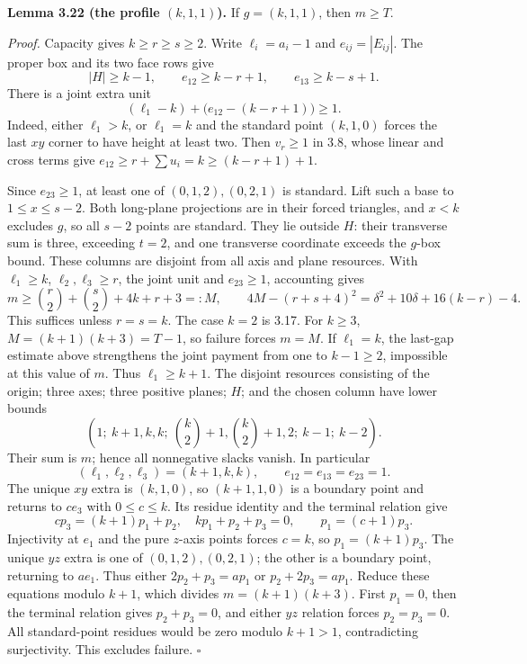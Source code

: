 \documentclass[11pt]{article}
\begin{document}
\label{res:A12.7}
\textbf{Lemma 3.22 (the profile $(k,1,1)$).}
If $g=(k,1,1)$, then $m\ge T$.

\emph{Proof.}
Capacity gives $k\ge r\ge s\ge2$.  Write $\ell_i=a_i-1$ and
$e_{ij}=|E_{ij}|$.  The proper box and its two face rows give
\[
 |H|\ge k-1,\qquad e_{12}\ge k-r+1,\qquad e_{13}\ge k-s+1.
\]
There is a joint extra unit
\[
 (\ell_1-k)+\bigl(e_{12}-(k-r+1)\bigr)\ge1.
\]
Indeed, either $\ell_1>k$, or $\ell_1=k$ and the standard point
$(k,1,0)$ forces the last $xy$ corner to have height at least two.
Then $v_r\ge1$ in 3.8, whose linear and cross terms give
$e_{12}\ge r+\sum u_i=k\ge(k-r+1)+1$.

Since $e_{23}\ge1$, at least one of $(0,1,2),(0,2,1)$ is standard.
Lift such a base to $1\le x\le s-2$.  Both long-plane projections
are in their forced triangles, and $x<k$ excludes $g$, so all $s-2$
points are standard.  They lie outside $H$: their transverse sum is
three, exceeding $t=2$, and one transverse coordinate exceeds the
$g$-box bound.  These columns are disjoint from all axis and plane
resources.  With $\ell_1\ge k$, $\ell_2,\ell_3\ge r$, the joint unit
and $e_{23}\ge1$, accounting gives
\[
 m\ge\binom r2+\binom s2+4k+r+3=:M,\qquad
 4M-(r+s+4)^2=\delta^2+10\delta+16(k-r)-4.\tag{3.13}
\]
This suffices unless $r=s=k$.  The case $k=2$ is 3.17.
For $k\ge3$, $M=(k+1)(k+3)=T-1$, so failure forces $m=M$.
If $\ell_1=k$, the last-gap estimate above strengthens the joint
payment from one to $k-1\ge2$, impossible at this value of $m$.
Thus $\ell_1\ge k+1$.  The disjoint resources consisting of the
origin; three axes; three positive planes; $H$; and the chosen column
have lower bounds
\[
 \left(1;\ k+1,k,k;\ \binom k2+1,\binom k2+1,2;\ k-1;\ k-2\right).
\]
Their sum is $m$; hence all nonnegative slacks vanish.  In particular
\[
 (\ell_1,\ell_2,\ell_3)=(k+1,k,k),\qquad
 e_{12}=e_{13}=e_{23}=1.
\]
The unique $xy$ extra is $(k,1,0)$, so $(k+1,1,0)$ is a boundary
point and returns to $ce_3$ with $0\le c\le k$.  Its residue identity
and the terminal relation give
\[
 cp_3=(k+1)p_1+p_2,\quad kp_1+p_2+p_3=0,
 \qquad p_1=(c+1)p_3.
\]
Injectivity at $e_1$ and the pure $z$-axis points forces $c=k$, so
$p_1=(k+1)p_3$.
The unique $yz$ extra is one of $(0,1,2),(0,2,1)$; the other is a
boundary point, returning to $ae_1$.  Thus either
$2p_2+p_3=ap_1$ or $p_2+2p_3=ap_1$.
Reduce these equations modulo $k+1$, which divides
$m=(k+1)(k+3)$.  First $p_1=0$, then the terminal relation gives
$p_2+p_3=0$, and either $yz$ relation forces $p_2=p_3=0$.
All standard-point residues would be zero modulo $k+1>1$,
contradicting surjectivity.  This excludes failure. \ensuremath{\square}
\end{document}
